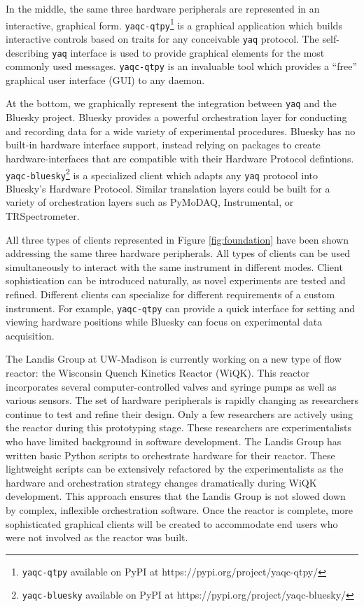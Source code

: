\documentclass[aip, amsmath, amssymb, reprint,]{revtex4-2}
\newcommand\yaq{\texttt{yaq}}
\begin{document}
In the middle, the same three hardware peripherals are represented in an interactive, graphical form.
\texttt{yaqc-qtpy}\footnote{\texttt{yaqc-qtpy} available on PyPI at https://pypi.org/project/yaqc-qtpy/} is a graphical application which builds interactive controls based on traits for any conceivable \yaq{} protocol.
The self-describing \yaq{} interface is used to provide graphical elements for the most commonly used messages.
\texttt{yaqc-qtpy} is an invaluable tool which provides a ``free'' graphical user interface (GUI) to any daemon.

At the bottom, we graphically represent the integration between \yaq{} and the Bluesky project\cite{AllanDanielB2019a}.
Bluesky provides a powerful orchestration layer for conducting and recording data for a wide variety of experimental procedures.
Bluesky has no built-in hardware interface support, instead relying on packages to create hardware-interfaces that are compatible with their Hardware Protocol defintions.
\texttt{yaqc-bluesky}\footnote{\texttt{yaqc-bluesky} available on PyPI at https://pypi.org/project/yaqc-bluesky/} is a specialized client which adapts any \yaq{} protocol into Bluesky's Hardware Protocol.
Similar translation layers could be built for a variety of orchestration layers such as PyMoDAQ\cite{WeberSebastien2021a}, Instrumental\cite{Bogdanowicz2022}, or TRSpectrometer\cite{trspectrometer}.

All three types of clients represented in Figure \ref{fig:foundation} have been shown addressing the same three hardware peripherals.
All types of clients can be used simultaneously to interact with the same instrument in different modes.
Client sophistication can be introduced naturally, as novel experiments are tested and refined.
Different clients can specialize for different requirements of a custom instrument.
For example, \texttt{yaqc-qtpy} can provide a quick interface for setting and viewing hardware positions while Bluesky can focus on experimental data acquisition.

The Landis Group at UW-Madison is currently working on a new type of flow reactor: the Wisconsin Quench Kinetics Reactor (WiQK).
This reactor incorporates several computer-controlled valves and syringe pumps as well as various sensors.
The set of hardware peripherals is rapidly changing as researchers continue to test and refine their design.
Only a few researchers are actively using the reactor during this prototyping stage.
These researchers are experimentalists who have limited background in software development.
The Landis Group has written basic Python scripts to orchestrate hardware for their reactor.
These lightweight scripts can be extensively refactored by the experimentalists as the hardware and orchestration strategy changes dramatically during WiQK development.
This approach ensures that the Landis Group is not slowed down by complex, inflexible orchestration software.
Once the reactor is complete, more sophisticated graphical clients will be created to accommodate end users who were not involved as the reactor was built.
\end{document}
